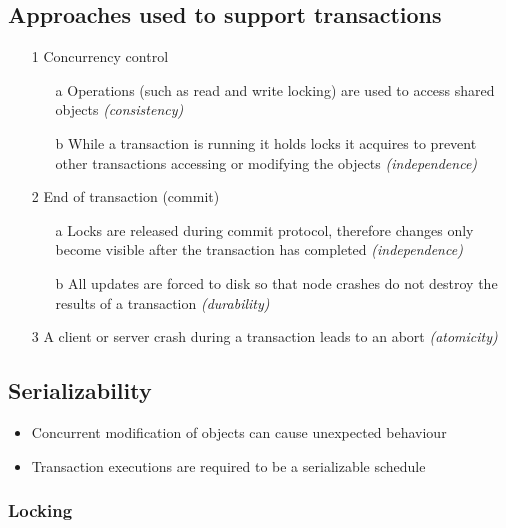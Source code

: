 \documentclass[a4paper]{article}
\begin{document}
\subsection{Approaches used to support transactions}

\begin{enumerate}
  \item[1] Concurrency control
    \begin{enumerate}
      \item[a] Operations (such as read and write locking) are used to access
               shared objects \textit{(consistency)}
      \item[b] While a transaction is running it holds locks it acquires to
               prevent other transactions accessing or modifying the objects
               \textit{(independence)}
    \end{enumerate}

  \item[2] End of transaction (commit)
    \begin{enumerate}
      \item[a] Locks are released during commit protocol, therefore changes only
               become visible after the transaction has completed
               \textit{(independence)}
      \item[b] All updates are forced to disk so that node crashes do not
               destroy the results of a transaction \textit{(durability)}
    \end{enumerate}

  \item[3] A client or server crash during a transaction leads to an abort
           \textit{(atomicity)}
\end{enumerate}

\subsection{Serializability}

\begin{itemize}
  \item Concurrent modification of objects can cause unexpected behaviour
  \item Transaction executions are required to be a serializable schedule
\end{itemize}

\subsubsection{Locking}
\end{document}
